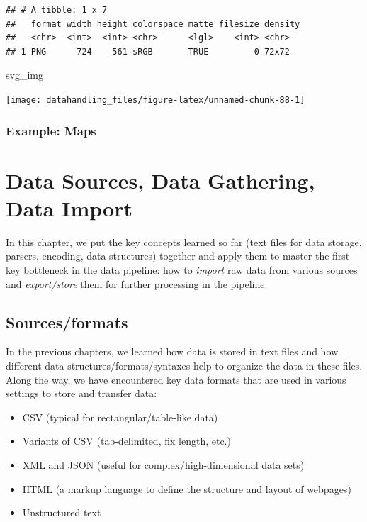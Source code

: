 \documentclass[
  12pt,
]{style/krantz}
\newenvironment{Shaded}{\begin{snugshade}}{\end{snugshade}}
\newcommand{\NormalTok}[1]{#1}
\providecommand{\tightlist}{%
  \setlength{\itemsep}{0pt}\setlength{\parskip}{0pt}}
\begin{document}
\begin{verbatim}
## # A tibble: 1 x 7
##   format width height colorspace matte filesize density
##   <chr>  <int>  <int> <chr>      <lgl>    <int> <chr>  
## 1 PNG      724    561 sRGB       TRUE         0 72x72
\end{verbatim}

\begin{Shaded}
\begin{Highlighting}[]
\NormalTok{svg\_img}
\end{Highlighting}
\end{Shaded}

\texttt{[image: datahandling\_files/figure-latex/unnamed-chunk-88-1]}

\hypertarget{example-maps}{%
\subsection{Example: Maps}\label{example-maps}}

\hypertarget{data-sources-data-gathering-data-import}{%
\chapter{Data Sources, Data Gathering, Data Import}\label{data-sources-data-gathering-data-import}}

In this chapter, we put the key concepts learned so far (text files for data storage, parsers, encoding, data structures) together and apply them to master the first key bottleneck in the data pipeline: how to \emph{import} raw data from various sources and \emph{export/store} them for further processing in the pipeline.

\hypertarget{sourcesformats}{%
\section{Sources/formats}\label{sourcesformats}}

In the previous chapters, we learned how data is stored in text files and how different data structures/formats/syntaxes help to organize the data in these files. Along the way, we have encountered key data formats that are used in various settings to store and transfer data:

\begin{itemize}
\tightlist
\item
  CSV (typical for rectangular/table-like data)
\item
  Variants of CSV (tab-delimited, fix length, etc.)
\item
  XML and JSON (useful for complex/high-dimensional data sets)
\item
  HTML (a markup language to define the structure and layout of webpages)
\item
  Unstructured text
\end{itemize}
\end{document}
